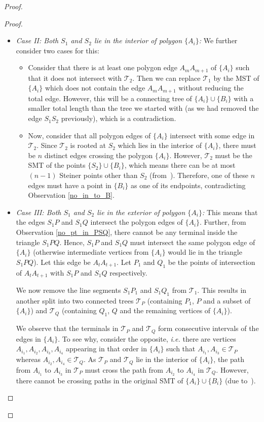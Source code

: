 \begin{proof}
\begin{proof}
\begin{itemize}
    \item \textit{Case II: Both $S_1$ and $S_2$ lie in the interior of polygon $\{A_i\}$:} We further consider two cases for this:

    \begin{itemize}
        \item Consider that there is at least one polygon edge $A_mA_{m+1}$ of $\{A_i\}$ such that it does not intersect with $\mathcal T_2$. Then we can replace $\mathcal T_1$ by the MST of $\{A_i\}$ which does not contain the edge $A_mA_{m+1}$ without reducing the total edge. However, this will be a connecting tree of $\{A_i\} \cup \{B_i\}$ with a smaller total length than the tree we started with (as we had removed the edge $S_1S_2$ previously), which is a contradiction.
        \item Now, consider that all polygon edges of $\{A_i\}$ intersect with some edge in $\mathcal T_2$. Since $\mathcal T_2$ is rooted at $S_2$ which lies in the interior of $\{A_i\}$, there must be $n$ distinct edges crossing the polygon $\{A_i\}$. However, $\mathcal T_2$ must be the SMT of the points $\{S_2\} \cup \{B_i\}$, which means there can be at most $(n - 1)$ Steiner points other than $S_2$ (from~). Therefore, one of these $n$ edges must have a point in $\{B_i\}$ as one of its endpoints, contradicting Observation \ref{no_in_to_B}. 

  
    \end{itemize}
    
    \item \textit{Case III: Both $S_1$ and $S_2$ lie in the exterior of polygon $\{A_i\}$:} This means that the edges $S_1P$ and $S_1Q$ intersect the polygon edges of $\{A_i\}$. Further, from Observation \ref{no_pt_in_PSQ}, there cannot be any terminal inside the triangle $S_1PQ$. Hence, $S_1P$ and $S_1Q$ must intersect the same polygon edge of $\{A_i\}$ (otherwise intermediate vertices from $\{A_i\}$ would lie in the triangle $S_1PQ$). Let this edge be $A_tA_{t+1}$. Let $P_1$ and $Q_1$ be the points of intersection of $A_tA_{t+1}$ with $S_1P$ and $S_1Q$ respectively.

    We now remove the line segments $S_1P_1$ and $S_1Q_1$ from $\mathcal T_1$. This results in another split into two connected trees $\mathcal T_P$ (containing $P_1$, $P$ and a subset of $\{A_i\}$) and $\mathcal T_Q$ (containing $Q_1$, $Q$ and the remaining vertices of $\{A_i\}$). 
    
    We observe that the terminals in $\mathcal T_P$ and $\mathcal T_Q$ form consecutive intervals of the edges in $\{A_i\}$. To see why, consider the opposite, \textit{i.e.} there are vertices $A_{i_1}, A_{i_2}, A_{i_3}, A_{i_4}$ appearing in that order in $\{A_i\}$ such that $A_{i_1}, A_{i_3} \in \mathcal T_P$ whereas $A_{i_2}, A_{i_4} \in \mathcal T_Q$. As $\mathcal T_P$ and $\mathcal T_Q$ lie in the interior of $\{A_i\}$, the path from $A_{i_1}$ to $A_{i_3}$ in $\mathcal T_P$ must cross the path from $A_{i_2}$ to $A_{i_4}$ in $\mathcal T_Q$. However, there cannot be crossing paths in the original SMT of $\{A_i\} \cup \{B_i\}$ (due to~). 
    

\end{itemize}
\end{proof}
\end{proof}
